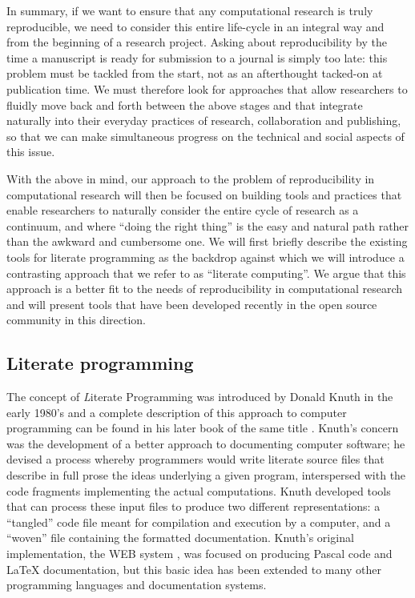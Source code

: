 \documentclass[ChapterTOCs,krantz2]{krantz} %
\begin{document}
In summary, if we want to ensure that any computational research is truly
reproducible, we need to consider this entire life-cycle in an integral way and
from the beginning of a research project.  Asking about reproducibility by the
time a manuscript is ready for submission to a journal is simply too late: this
problem must be tackled from the start, not as an afterthought tacked-on at
publication time.  We must therefore look for approaches that allow researchers
to fluidly move back and forth between the above stages and that integrate
naturally into their everyday practices of research, collaboration and
publishing, so that we can make simultaneous progress on the technical and
social aspects of this issue.

With the above in mind, our approach to the problem of reproducibility in
computational research will then be focused on building tools and practices
that enable researchers to naturally consider the entire cycle of research as a
continuum, and where ``doing the right thing'' is the easy and natural path
rather than the awkward and cumbersome one.  We will first briefly describe the
existing tools for literate programming as the backdrop against which we will
introduce a contrasting approach that we refer to as ``literate computing''.
We argue that this approach is a better fit to the needs of reproducibility in
computational research and will present tools that have been developed recently
in the open source community in this direction.

\subsection{Literate programming}

The concept of {\emph Literate Programming} was introduced by Donald Knuth in
the early 1980's \cite{Knuth:1983:LP} and a complete description of this
approach to computer programming can be found in his later book of the same
title \cite{Knuth92}.  Knuth's concern was the development of a better approach
to documenting computer software; he devised a process whereby programmers
would write literate source files that describe in full prose the ideas
underlying a given program, interspersed with the code fragments implementing
the actual computations.  Knuth developed tools that can process these input
files to produce two different representations: a ``tangled'' code file meant
for compilation and execution by a computer, and a ``woven'' file containing
the formatted documentation.  Knuth's original implementation, the WEB system
\cite{Knuth:1983:WSS}, was focused on producing Pascal code and \LaTeX
documentation, but this basic idea has been extended to many other programming
languages and documentation systems.  
\end{document}
